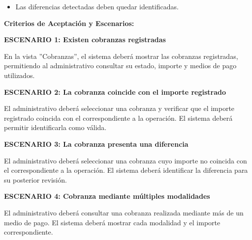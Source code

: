 \documentclass[a4paper,9pt]{article}
\begin{document}
\begin{tcolorbox}[hucard, title={\textbf{HU-19: CONSULTAR Y VALIDAR COBRANZAS} \hfill \scriptsize \colorbox{redstatus}{\textbf{\ Rejected\ }} \quad \colorbox{white}{\textcolor{primarydark}{\textbf{\ 8 pts\ }}}}]
{\begin{itemize}[leftmargin=12pt, nosep, itemsep=1.5pt, topsep=1pt]
\item Las diferencias detectadas deben quedar identificadas.
\end{itemize}
}\par\vspace{3pt}
\noindent\textbf{\footnotesize Criterios de Aceptación y Escenarios:}\par\vspace{2pt}
{\footnotesize
\noindent\textbf{\textcolor{secondarydark}{ESCENARIO 1:  Existen cobranzas registradas}}\par\vspace{1pt}
En la vista ''Cobranzas'', el sistema deberá mostrar las cobranzas registradas, permitiendo al administrativo consultar su estado, importe y medios de pago utilizados.\par\vspace{2.5pt}
\noindent\textbf{\textcolor{secondarydark}{ESCENARIO 2:  La cobranza coincide con el importe registrado}}\par\vspace{1pt}
El administrativo deberá seleccionar una cobranza y verificar que el importe registrado coincida con el correspondiente a la operación. El sistema deberá permitir identificarla como válida.\par\vspace{2.5pt}
\noindent\textbf{\textcolor{secondarydark}{ESCENARIO 3:  La cobranza presenta una diferencia}}\par\vspace{1pt}
El administrativo deberá seleccionar una cobranza cuyo importe no coincida con el correspondiente a la operación. El sistema deberá identificar la diferencia para su posterior revisión.\par\vspace{2.5pt}
\noindent\textbf{\textcolor{secondarydark}{ESCENARIO 4:  Cobranza mediante múltiples modalidades}}\par\vspace{1pt}
El administrativo deberá consultar una cobranza realizada mediante más de un medio de pago. El sistema deberá mostrar cada modalidad y el importe correspondiente.\par\vspace{2.5pt}
}\par
\end{tcolorbox}
\end{document}
